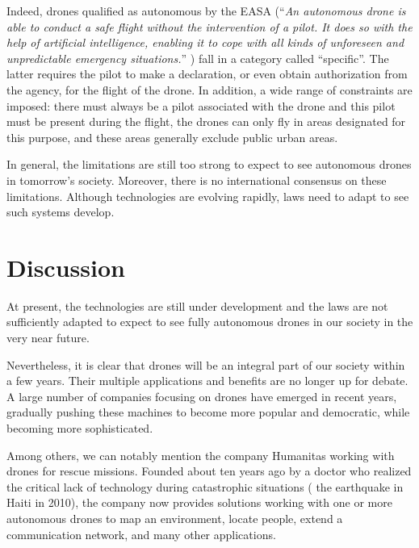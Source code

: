 Indeed, drones qualified as autonomous by the EASA (\enquote{\emph{An autonomous drone is able to conduct a safe flight without the intervention of a pilot. It does so with the help of artificial intelligence, enabling it to cope with all kinds of unforeseen and unpredictable emergency situations.}} \cite{easa2021autonomousuav}) fall in a category called \enquote{specific}. The latter requires the pilot to make a declaration, or even obtain authorization from the agency, for the flight of the drone. In addition, a wide range of constraints are imposed: there must always be a pilot associated with the drone and this pilot must be present during the flight, the drones can only fly in areas designated for this purpose, and these areas generally exclude public urban areas.

In general, the limitations are still too strong to expect to see autonomous drones in tomorrow's society. Moreover, there is no international consensus on these limitations. Although technologies are evolving rapidly, laws need to adapt to see such systems develop.

\section{Discussion}

At present, the technologies are still under development and the laws are not sufficiently adapted to expect to see fully autonomous drones in our society in the very near future.

Nevertheless, it is clear that drones will be an integral part of our society within a few years. Their multiple applications and benefits are no longer up for debate. A large number of companies focusing on drones have emerged in recent years, gradually pushing these machines to become more popular and democratic, while becoming more sophisticated.

Among others, we can notably mention the company Humanitas \cite{humanitas2021website} working with drones for rescue missions. Founded about ten years ago by a doctor who realized the critical lack of technology during catastrophic situations (\eg{} the earthquake in Haiti in 2010), the company now provides solutions working with one or more autonomous drones to map an environment, locate people, extend a communication network, and many other applications.
